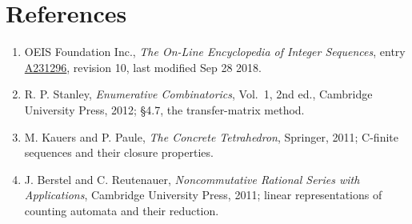 \documentclass[11pt]{article}
\theoremstyle{definition}
\begin{document}
\section{References}

\begin{enumerate}

\item OEIS Foundation Inc., \emph{The On-Line Encyclopedia of Integer Sequences}, entry \href{https://oeis.org/A231296}{A231296}, revision 10, last modified Sep 28 2018.

\item R. P. Stanley, \emph{Enumerative Combinatorics}, Vol.~1, 2nd ed., Cambridge University Press, 2012; \S4.7, the transfer-matrix method.

\item M. Kauers and P. Paule, \emph{The Concrete Tetrahedron}, Springer, 2011; C-finite sequences and their closure properties.

\item J. Berstel and C. Reutenauer, \emph{Noncommutative Rational Series with Applications}, Cambridge University Press, 2011; linear representations of counting automata and their reduction.

\end{enumerate}
\end{document}
